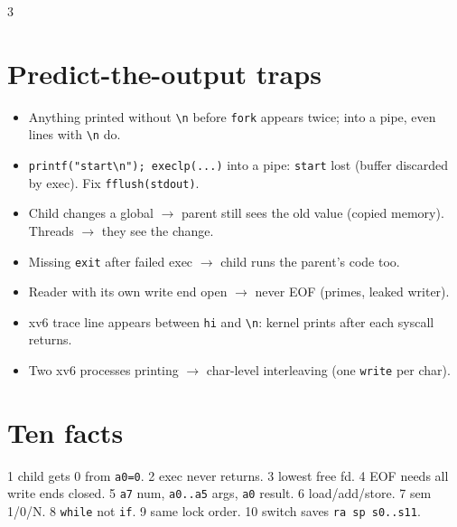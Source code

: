 \documentclass[9pt]{extarticle}
\newcommand{\cc}[1]{\texttt{#1}}
\newcommand{\ra}{$\rightarrow$}
\begin{document}
\begin{multicols*}{3}
\section{Predict-the-output traps}
\begin{itemize}
\item Anything printed without \cc{\textbackslash n} before \cc{fork} appears twice; into a pipe, even lines with \cc{\textbackslash n} do.
\item \cc{printf("start\textbackslash n"); execlp(...)} into a pipe: \cc{start} lost (buffer discarded by exec). Fix \cc{fflush(stdout)}.
\item Child changes a global \ra{} parent still sees the old value (copied memory). Threads \ra{} they see the change.
\item Missing \cc{exit} after failed exec \ra{} child runs the parent's code too.
\item Reader with its own write end open \ra{} never EOF (primes, leaked writer).
\item xv6 trace line appears between \cc{hi} and \cc{\textbackslash n}: kernel prints after each syscall returns.
\item Two xv6 processes printing \ra{} char-level interleaving (one \cc{write} per char).
\end{itemize}

\section{Ten facts}
\small 1 child gets 0 from \cc{a0=0}. 2 exec never returns. 3 lowest free fd. 4 EOF needs all write ends closed. 5 \cc{a7} num, \cc{a0..a5} args, \cc{a0} result. 6 load/add/store. 7 sem 1/0/N. 8 \cc{while} not \cc{if}. 9 same lock order. 10 switch saves \cc{ra sp s0..s11}.
\end{multicols*}
\end{document}
